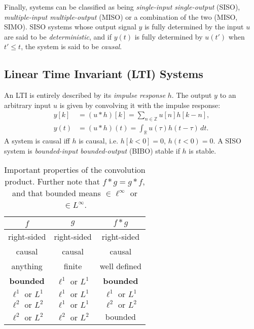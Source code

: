 Finally, systems can be classified as being \emph{single-input single-output}
(SISO), \emph{multiple-input multiple-output} (MISO) or a combination of the
two (MISO, SIMO). SISO systems whose output signal $y$ is fully determined by the
input $u$ are said to be \emph{deterministic}, and if $y(t)$ is fully determined
by $u(t')$ when $t' \leq t$, the system is said to be \emph{causal}.

\subsection{Linear Time Invariant (LTI) Systems}

An LTI is entirely described by its \emph{impulse response} $h$. The output
$y$ to an arbitrary input $u$ is given by convolving it with the impulse
response:
\begin{align*}
	y[k] &= (u * h)[k] = \sum_{n\in\mathbb{Z}} u[n] h[k - n], \\
	y(t) &= (u * h)(t) = \int_\mathbb{R} u(\tau) h(t - \tau) \, dt.
\end{align*}
A system is causal iff $h$ is causal, i.e. $h[k < 0] = 0$, $h(t < 0) = 0$. A
SISO system is \emph{bounded-input bounded-output} (BIBO) stable if $h$ is
stable.

\begin{table}
	\centering
	\begin{tabular}{ccc}
		\toprule
		$f$ & $g$ & $f * g$ \\
		\midrule
		right-sided & right-sided & right-sided  \\
		causal      & causal      & causal       \\
		anything    & finite      & well defined \\
		\midrule
		\bfseries bounded
			& $\ell^1\text{ or }L^1$
			& \bfseries bounded \\
		$\ell^1\text{ or }L^1$
			& $\ell^1\text{ or }L^1$
			& $\ell^1\text{ or }L^1$ \\
		\midrule
		$\ell^2\text{ or }L^2$
			& $\ell^1\text{ or }L^1$
			& $\ell^2\text{ or }L^2$ \\
		$\ell^2\text{ or }L^2$
			& $\ell^2\text{ or }L^2$
			& bounded \\
		\bottomrule
	\end{tabular}
	\caption{
		Important properties of the convolution product. Further note that $f * g
		= g * f$, and that bounded means $\in \ell^\infty$ or $\in L^\infty$.
	}
\end{table}
